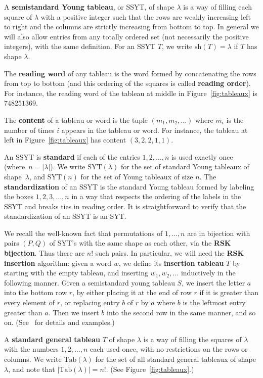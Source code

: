 \documentclass[ALCO,Unicode]{cedram}
\newcommand{\SYT}{\mathrm{SYT}}
\newcommand{\sh}{\mathrm{sh}}
\newcommand{\Tab}{\mathrm{Tab}}
\begin{document}
A \textbf{semistandard Young tableau}, or SSYT, of shape $\lambda$ is a way of filling each square of $\lambda$ with a positive integer such that the rows are weakly increasing left to right and the columns are strictly increasing from bottom to top.  In general we will also allow entries from any totally ordered set (not necessarily the positive integers), with the same definition.   For an SSYT $T$, we write $\sh(T)=\lambda$ if $T$ has shape $\lambda$.


The \textbf{reading word} of any tableau is the word formed by concatenating the rows from top to bottom (and this ordering of the squares is called \textbf{reading order}).  For instance, the reading word of the tableau at middle in Figure~\ref{fig:tableaux} is $748251369$.

The \textbf{content} of a tableau or word is the tuple $(m_1,m_2,\ldots)$ where $m_i$ is the number of times $i$ appears in the tableau or word.  For instance, the tableau at left in Figure~\ref{fig:tableaux} has content $(3,2,2,1,1)$.


An SSYT is \textbf{standard} if each of the entries $1,2,\ldots,n$ is used exactly once (where~$n=|\lambda|$).  We write $\SYT(\lambda)$ for the set of standard Young tableaux of shape~$\lambda$, and $\SYT(n)$ for the set of Young tableaux of size $n$.  The \textbf{standardization} of an SSYT is the standard Young tableau formed by labeling the boxes $1,2,3,\ldots,n$ in a way that respects the ordering of the labels in the SSYT and breaks ties in reading order.  It is straightforward to verify that the standardization of an SSYT is an SYT.

We recall the well-known fact that permutations of $1,\ldots,n$ are in bijection with pairs $(P,Q)$ of SYT's with the same shape as each other, via the \textbf{RSK bijection}.  Thus there are $n!$ such pairs.  In particular, we will need the \textbf{RSK insertion} algorithm: given a word $w$, we define its \textbf{insertion tableau} $T$ by starting with the empty tableau, and inserting $w_1,w_2,\ldots$ inductively in the following manner.  Given a semistandard young tableau $S$, we insert the letter $a$ into the bottom row $r$, by either placing it at the end of row $r$ if it is greater than every element of $r$, or replacing entry $b$ of $r$ by $a$ where $b$ is the leftmost entry greater than $a$.  Then we insert $b$ into the second row in the same manner, and so on.  (See~\cite{Fulton} for details and examples.)

A \textbf{standard general tableau} $T$ of shape $\lambda$ is a way of filling the squares of $\lambda$ with the numbers $1,2,\ldots,n$ each used once, with no restrictions on the rows or columns.  We write $\Tab(\lambda)$ for the set of all standard general tableaux of shape $\lambda$, and note that $|\Tab(\lambda)|=n!$.  (See Figure~\ref{fig:tableaux}.)
\end{document}
